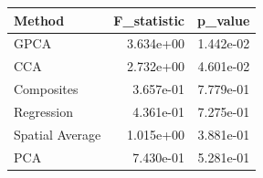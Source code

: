 \begin{tabular}{lrr}
\toprule
Method & F_statistic & p_value \\
\midrule
GPCA & 3.634e+00 & 1.442e-02 \\
CCA & 2.732e+00 & 4.601e-02 \\
Composites & 3.657e-01 & 7.779e-01 \\
Regression & 4.361e-01 & 7.275e-01 \\
Spatial Average & 1.015e+00 & 3.881e-01 \\
PCA & 7.430e-01 & 5.281e-01 \\
\bottomrule
\end{tabular}
